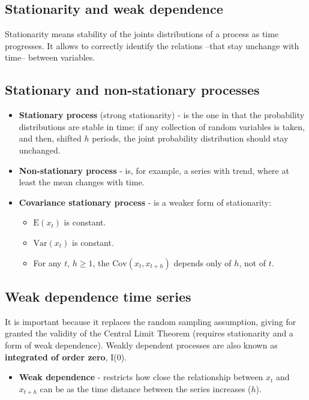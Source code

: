 \documentclass[10pt, a4paper, landscape]{extarticle}
\newcommand{\E}{\mathrm{E}}
\newcommand{\Var}{\mathrm{Var}}
\newcommand{\Cov}{\mathrm{Cov}}
\begin{document}
\begin{multicols}{3}
\section*{Stationarity and weak dependence}

Stationarity means stability of the joints distributions of a process as time progresses. It allows to correctly identify the relations --that stay unchange with time-- between variables.

\subsection*{Stationary and non-stationary processes}

\begin{itemize}[leftmargin=*]
	\item \textbf{Stationary process} (strong stationarity) - is the one in that the probability distributions are stable in time: if any collection of random variables is taken, and then, shifted $h$ periods, the joint probability distribution should stay unchanged.

\columnbreak

	\item \textbf{Non-stationary process} - is, for example, a series with trend, where at least the mean changes with time.
	\item \textbf{Covariance stationary process} - is a weaker form of stationarity:
	\begin{itemize}[leftmargin=*]
		\item $\E(x_t)$ is constant.
		\item $\Var(x_t)$ is constant.
		\item For any $t$,  $h \geq 1$, the $\Cov(x_t, x_{t + h})$ depends only of $h$, not of $t$.
	\end{itemize}
\end{itemize}

\subsection*{Weak dependence time series}

It is important because it replaces the random sampling assumption, giving for granted the validity of the Central Limit Theorem (requires stationarity and a form of weak dependence). Weakly dependent processes are also known as \textbf{integrated of order zero}, I(0).

\begin{itemize}[leftmargin=*]
	\item \textbf{Weak dependence} - restricts how close the relationship between $x_t$ and $x_{t + h}$ can be as the time distance between the series increases ($h$).
\end{itemize}


\end{multicols}
\end{document}
